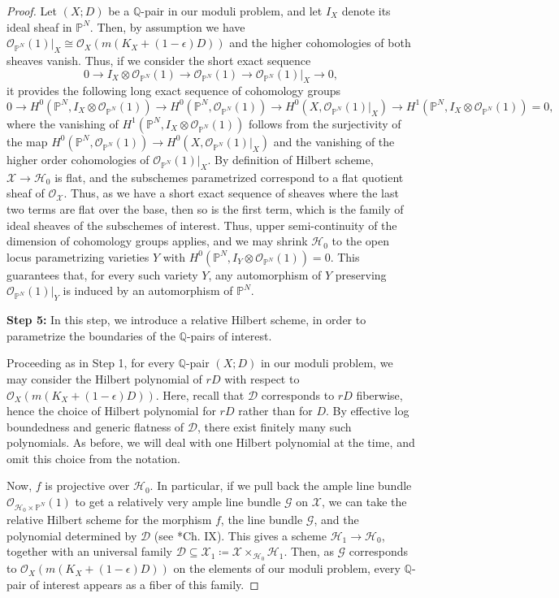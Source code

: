 \documentclass{amsart}
\newcommand{\bP}{\mathbb{P}}
\newcommand{\bQ}{\mathbb{Q}}
\newcommand{\sD}{\mathscr{D}}
\newcommand{\sG}{\mathscr{G}}
\newcommand{\sH}{\mathscr{H}}
\newcommand{\sX}{\mathscr{X}}
\newcommand{\cD}{\mathcal{D}}
\newcommand{\cO}{\mathcal{O}}
\theoremstyle{definition}
\newcommand{\rar}{\rightarrow}
\def\O#1.{\mathcal {O}_{#1}}
\def\pr #1.{\mathbb P^{#1}}
\def\K#1.{K_{#1}}
\begin{document}
\begin{proof}
Let $(X;D)$ be a $\bQ$-pair in our moduli problem, and let $I_X$ denote its ideal sheaf in $\pr N.$.
Then, by assumption we have $\O {\mathbb P ^N}.(1)|_X \cong \O X. (m(\K X. + (1-\epsilon)D))$ and the higher cohomologies of both sheaves vanish.
Thus, if we consider the short exact sequence
\[
0 \rar I_X \otimes \O {\mathbb P ^N}.(1) \rar \O {\mathbb P ^N}.(1) \rar \O {\mathbb P ^N}.(1)|_X \rar 0,
\]
it provides the following long exact sequence of cohomology groups
\[
0 \rar H^0(\pr N.,I_X \otimes \O {\mathbb P ^N}.(1)) \rar H^0(\pr N.,\O {\mathbb P ^N}.(1)) \rar H^0(X,\O {\mathbb P ^N}.(1)|_X) \rar H^1(\pr N.,I_X \otimes \O {\mathbb P ^N}.(1))=0,
\]
where the vanishing of $H^1(\pr N.,I_X \otimes \O {\mathbb P ^N}.(1))$ follows from the surjectivity of the map $H^0(\pr N.,\O {\mathbb P ^N}.(1)) \rar H^0(X,\O {\mathbb P ^N}.(1)|_X)$ and the vanishing of the higher order cohomologies of $\O {\mathbb P ^N}.(1)|_X$.
By definition of Hilbert scheme, $\sX \rar \sH_0$ is flat, and the subschemes parametrized correspond to a flat quotient sheaf of $\O \sX.$.
Thus, as we have a short exact sequence of sheaves where the last two terms are flat over the base, then so is the first term, which is the family of ideal sheaves of the subschemes of interest.
Thus, upper semi-continuity of the dimension of cohomology groups applies, and we may shrink $\sH _0$ to the open locus parametrizing varieties $Y$ with $H^0(\pr N.,I_Y \otimes \O {\mathbb P ^N}.(1))=0$.
This guarantees that, for every such variety $Y$, any automorphism of $Y$ preserving $\O {\mathbb P ^N}.(1)|_Y$ is induced by an automorphism of $\pr N.$.

{\bf Step 5:} In this step, we introduce a relative Hilbert scheme, in order to parametrize the boundaries of the $\bQ$-pairs of interest.

Proceeding as in Step 1, for every $\bQ$-pair $(X;D)$ in our moduli problem, we may consider the Hilbert polynomial of $rD$ with respect to $\cO_X(m(\K X.+(1-\epsilon)D))$.
Here, recall that $\cD$ corresponds to $rD$ fiberwise, hence the choice of Hilbert polynomial for $rD$ rather than for $D$.
By effective log boundedness and generic flatness of $\cD$, there exist finitely many such polynomials.
As before, we will deal with one Hilbert polynomial at the time, and omit this choice from the notation.

Now, $f$ is projective over $\sH_0$.
In particular, if we pull back the ample line bundle $\cO_{\sH_0\times \bP^N}(1)$ to get a relatively very ample line bundle $\sG$ on $\sX$, we can take the relative Hilbert scheme for the morphism $f$, the line bundle $\sG$, and the polynomial determined by $\cD$ (see \cite{ACH11}*{Ch. IX}).
This gives a scheme $\sH_1\to \sH_0$, together with an universal family $\sD\subseteq \sX_1 \coloneqq \sX\times_{\sH_0} \sH_1$.
Then, as $\sG$ corresponds to $\cO_X(m(\K X.+(1-\epsilon)D))$ on the elements of our moduli problem, every $\bQ$-pair of interest appears as a fiber of this family.




\end{proof}
\end{document}
